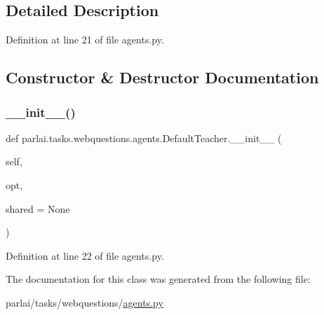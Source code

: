 \subsection{Detailed Description}


Definition at line 21 of file agents.\+py.



\subsection{Constructor \& Destructor Documentation}
\mbox{\label{classparlai_1_1tasks_1_1webquestions_1_1agents_1_1DefaultTeacher_a5206081c0932010aa0cb6ac15eb51ed1}} 
\subsubsection{\texorpdfstring{\+\_\+\+\_\+init\+\_\+\+\_\+()}{\_\_init\_\_()}}
{\footnotesize\ttfamily def parlai.\+tasks.\+webquestions.\+agents.\+Default\+Teacher.\+\_\+\+\_\+init\+\_\+\+\_\+ (\begin{DoxyParamCaption}\item[{}]{self,  }\item[{}]{opt,  }\item[{}]{shared = {\ttfamily None} }\end{DoxyParamCaption})}



Definition at line 22 of file agents.\+py.



The documentation for this class was generated from the following file\+:\begin{DoxyCompactItemize}
\item 
parlai/tasks/webquestions/\hyperlink{parlai_2tasks_2webquestions_2agents_8py}{agents.\+py}\end{DoxyCompactItemize}
